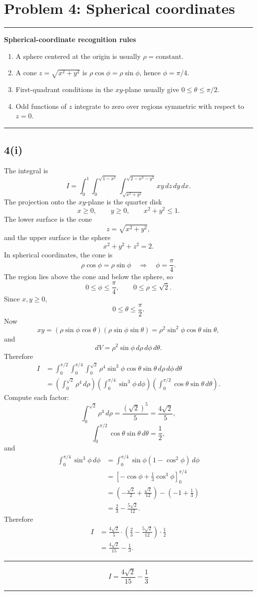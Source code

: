 \documentclass[11pt,a4paper]{article}
\newenvironment{methodbox}[1]{\par\medskip\noindent\begin{minipage}{\linewidth}\hrule\smallskip\textbf{#1}\par\smallskip}{\smallskip\hrule\end{minipage}\par\medskip}
\newenvironment{resultbox}{\par\medskip\noindent\begin{minipage}{\linewidth}\hrule\smallskip}{\smallskip\hrule\end{minipage}\par\medskip}
\newcommand{\ans}[1]{\begin{resultbox}\[\boxed{#1}\]\end{resultbox}}
\begin{document}
\section{Problem 4: Spherical coordinates}

\begin{methodbox}{Spherical-coordinate recognition rules}
\begin{enumerate}[label=\arabic*.]
\item A sphere centered at the origin is usually \(\rho=\text{constant}\).
\item A cone \(z=\sqrt{x^2+y^2}\) is \(\rho\cos\phi=\rho\sin\phi\), hence \(\phi=\pi/4\).
\item First-quadrant conditions in the \(xy\)-plane usually give \(0\le\theta\le\pi/2\).
\item Odd functions of \(z\) integrate to zero over regions symmetric with respect to \(z=0\).
\end{enumerate}
\end{methodbox}

\subsection*{4(i)}
The integral is
\[
I=\int_0^1\int_0^{\sqrt{1-x^2}}
\int_{\sqrt{x^2+y^2}}^{\sqrt{2-x^2-y^2}}xy\,dz\,dy\,dx.
\]
The projection onto the \(xy\)-plane is the quarter disk
\[
x\ge0,
\qquad y\ge0,
\qquad x^2+y^2\le1.
\]
The lower surface is the cone
\[
z=\sqrt{x^2+y^2},
\]
and the upper surface is the sphere
\[
x^2+y^2+z^2=2.
\]
In spherical coordinates, the cone is
\[
\rho\cos\phi=\rho\sin\phi
\quad\Longrightarrow\quad
\phi=\frac\pi4.
\]
The region lies above the cone and below the sphere, so
\[
0\le\phi\le\frac\pi4,
\qquad 0\le\rho\le\sqrt2.
\]
Since \(x,y\ge0\),
\[
0\le\theta\le\frac\pi2.
\]
Now
\[
xy=(\rho\sin\phi\cos\theta)(\rho\sin\phi\sin\theta)
=\rho^2\sin^2\phi\cos\theta\sin\theta,
\]
and
\[
dV=\rho^2\sin\phi\,d\rho\,d\phi\,d\theta.
\]
Therefore
\begin{align*}
I&=\int_0^{\pi/2}\int_0^{\pi/4}\int_0^{\sqrt2}
\rho^4\sin^3\phi\cos\theta\sin\theta\,d\rho\,d\phi\,d\theta\\
&=\left(\int_0^{\sqrt2}\rho^4\,d\rho\right)
\left(\int_0^{\pi/4}\sin^3\phi\,d\phi\right)
\left(\int_0^{\pi/2}\cos\theta\sin\theta\,d\theta\right).
\end{align*}
Compute each factor:
\[
\int_0^{\sqrt2}\rho^4\,d\rho=\frac{(\sqrt2)^5}{5}=\frac{4\sqrt2}{5},
\]
\[
\int_0^{\pi/2}\cos\theta\sin\theta\,d\theta=\frac12,
\]
and
\begin{align*}
\int_0^{\pi/4}\sin^3\phi\,d\phi
&=\int_0^{\pi/4}\sin\phi(1-\cos^2\phi)\,d\phi\\
&=\left[-\cos\phi+\frac13\cos^3\phi\right]_0^{\pi/4}\\
&=\left(-\frac{\sqrt2}{2}+\frac{\sqrt2}{12}\right)-\left(-1+\frac13\right)\\
&=\frac23-\frac{5\sqrt2}{12}.
\end{align*}
Therefore
\begin{align*}
I&=\frac{4\sqrt2}{5}\cdot\left(\frac23-\frac{5\sqrt2}{12}\right)\cdot\frac12\\
&=\frac{4\sqrt2}{15}-\frac13.
\end{align*}
\ans{I=\frac{4\sqrt2}{15}-\frac13}
\end{document}
